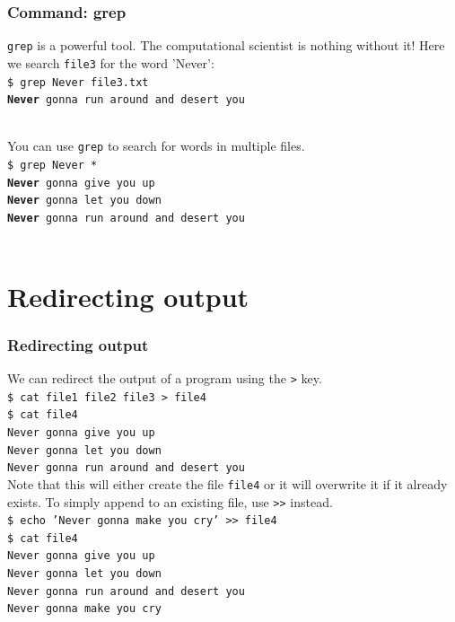 \documentclass{if-beamer}
\begin{document}
\begin{frame}
\frametitle{Command: grep}
\texttt{grep} is a powerful tool. The computational scientist is nothing
without it! Here we search \texttt{file3} for the word 'Never': \\[0.5cm]

\texttt{\$ grep Never file3.txt} \\
\texttt{\textbf{Never} gonna run around and desert you}
\\~\

You can use \texttt{grep} to search for words in multiple files. \\[0.5cm]
\texttt{\$ grep Never *} \\
\texttt{\textbf{Never} gonna give you up}\\
\texttt{\textbf{Never} gonna let you down} \\
\texttt{\textbf{Never} gonna run around and desert you}
\\~\

\end{frame}

\section{Redirecting output}

\begin{frame}
\frametitle{Redirecting output}
\vspace{1cm}
We can redirect the output of a program using the \texttt{>} key.
\\[0.5cm]
{ \footnotesize 
\texttt{\$ cat file1 file2 file3 > file4} \\
\texttt{\$ cat file4} \\
\texttt{Never gonna give you up} \\
\texttt{Never gonna let you down} \\
\texttt{Never gonna run around and desert you} \\
}
\vspace{4 pt} Note that this will either create the file \texttt{file4} or it will
overwrite it if it already exists. To simply append to an existing file,
use \texttt{>>} instead. \\[0.5cm]
{ \footnotesize 
\texttt{\$ echo 'Never gonna make you cry' >> file4} \\
\texttt{\$ cat file4} \\
\texttt{Never gonna give you up} \\
\texttt{Never gonna let you down} \\
\texttt{Never gonna run around and desert you} \\
\texttt{Never gonna make you cry} \\
}
\end{frame}
\end{document}
